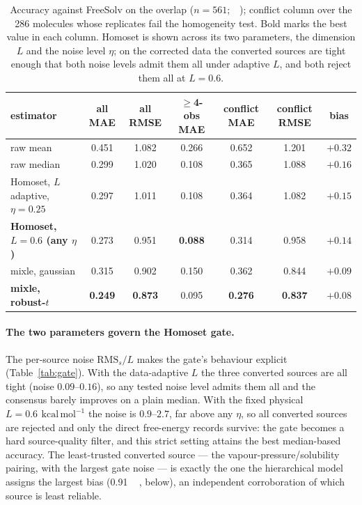 \documentclass[11pt]{article}
\newcommand{\kcal}{\,\mathrm{kcal\,mol^{-1}}}
\begin{document}
\begin{table}[t]
\centering
\small
{}
\begin{tabular}{@{}l S S S S S c@{}}
\toprule
estimator & {all MAE} & {all RMSE} & {$\ge$4-obs MAE} & {conflict MAE} & {conflict RMSE} & {bias} \\
\midrule
raw mean                                & 0.451 & 1.082 & 0.266 & 0.652 & 1.201 & $+0.32$ \\
raw median                              & 0.299 & 1.020 & 0.108 & 0.365 & 1.088 & $+0.16$ \\
Homoset, $L$ adaptive, $\eta{=}0.25$    & 0.297 & 1.011 & 0.108 & 0.364 & 1.082 & $+0.15$ \\
\textbf{Homoset, $L{=}0.6$ (any $\eta$)} & 0.273 & 0.951 & \bfseries 0.088 & 0.314 & 0.958 & $+0.14$ \\
mixle, gaussian                         & 0.315 & 0.902 & 0.150 & 0.362 & 0.844 & $+0.09$ \\
\textbf{mixle, robust-$t$}              & \bfseries 0.249 & \bfseries 0.873 & 0.095 & \bfseries 0.276 & \bfseries 0.837 & \bfseries $+0.08$ \\
\bottomrule
\end{tabular}
\caption{Accuracy against FreeSolv on the overlap ($n=561$; \si{\kcal}); conflict column over
the 286 molecules whose replicates fail the homogeneity test. Bold marks the best value in each
column. Homoset is shown across its two parameters, the dimension $L$ and the noise level
$\eta$; on the corrected data the converted sources are tight enough that both noise levels admit
them all under adaptive $L$, and both reject them all at $L{=}0.6$.}
\label{tab:main}
\end{table}

\paragraph{The two parameters govern the Homoset gate.} The per-source noise
$\mathrm{RMS}_s/L$ makes the gate's behaviour explicit (Table~\ref{tab:gate}). With the
data-adaptive $L$ the three converted sources are all tight (noise $0.09$--$0.16$), so any tested
noise level admits them all and the consensus barely improves on a plain median. With the fixed
physical $L=\SI{0.6}{\kcal}$ the noise is $0.9$--$2.7$, far above any $\eta$, so all converted
sources are rejected and only the direct free-energy records survive: the gate becomes a hard
source-quality filter, and this strict setting attains the best median-based accuracy. The
least-trusted converted source --- the vapour-pressure/solubility pairing, with the largest gate
noise --- is exactly the one the hierarchical model assigns the largest bias (\SI{+0.91}{\kcal},
below), an independent corroboration of which source is least reliable.
\end{document}
